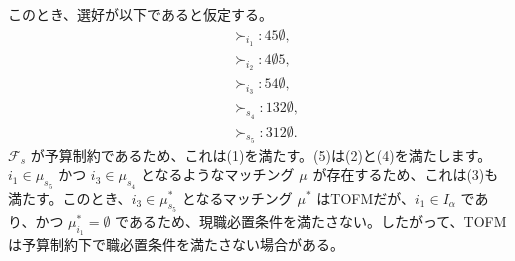 \documentclass[12pt, a4paper]{article}
\theoremstyle{definition}
\theoremstyle{remark}
\theoremstyle{plain}
\newtheorem{theorem}{定理}
\begin{document}
このとき、選好が以下であると仮定する。
\begin{align*}
    &\succ_{i_1}: 45\emptyset, \\
    &\succ_{i_2}: 4\emptyset 5, \\
    &\succ_{i_3}: 54\emptyset, \\
    &\succ_{s_4}: 132\emptyset, \\
    &\succ_{s_5}: 312\emptyset. \tag{5}
\end{align*}
$\mathcal{F}_s$ が予算制約であるため、これは(1)を満たす。(5)は(2)と(4)を満たします。$i_1 \in \mu_{s_5}$ かつ $i_3 \in \mu_{s_4}$ となるようなマッチング $\mu$ が存在するため、これは(3)も満たす。このとき、$i_3 \in \mu^*_{s_5}$ となるマッチング $\mu^*$ はTOFMだが、$i_1 \in I_\alpha$ であり、かつ $\mu^*_{i_1} = \emptyset$ であるため、現職必置条件を満たさない。したがって、TOFMは予算制約下で職必置条件を満たさない場合がある。

    
    
\end{document}
